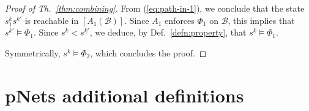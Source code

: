 \documentclass{llncs}
\newcommand{\defn}[1]{Def.~\ref{defn:#1}}
\newcommand{\eq}[1]{(\ref{eq:#1})}
\newcommand{\thm}[1]{Th.~\ref{thm:#1}}
\newcommand{\cB}{\ensuremath{\mathcal{B}}}
\newcommand{\order}{<}
\newcommand{\semopen}[1]{\ensuremath{[{#1}]}}
\begin{document}
\begin{proof}[Proof of \thm{combining}]
  From \eq{path-in-1}, we conclude that the state $s^k_1
  s^{k\prime}$ is reachable in $\semopen{A_1(\cB)}$.  Since $A_1$
  enforces $\Phi_1$ on $\cB$, this implies that $s^{k\prime}
  \models \Phi_1$.  Since $s^k \order s^{k\prime}$, we deduce, by
  \defn{property}, that $s^k \models \Phi_1$.

  Symmetrically, $s^k \models \Phi_2$, which concludes
  the proof.
\end{proof}


\section{pNets additional definitions}
\label{secn:pNets:additional}
\end{document}
